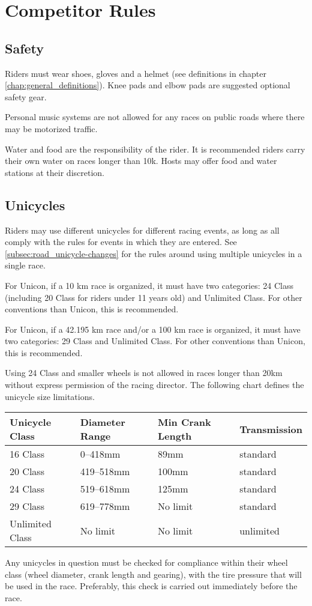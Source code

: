 \chapter{Competitor Rules}

\section{Safety}
Riders must wear shoes, gloves and a helmet (see definitions in chapter \ref{chap:general_definitions}).
Knee pads and elbow pads are suggested optional safety gear.

Personal music systems are not allowed for any races on public roads where there may be motorized traffic.

Water and food are the responsibility of the rider.
It is recommended riders carry their own water on races longer than 10k.
Hosts may offer food and water stations at their discretion.

\section{Unicycles}

Riders may use different unicycles for different racing events, as long as all comply with the rules for events in which they are entered.
See \ref{subsec:road_unicycle-changes} for the rules around using multiple unicycles in a single race.

For Unicon, if a 10 km race is organized, it must have two categories: 24 Class (including 20 Class for riders under 11 years old) and Unlimited Class.
For other conventions than Unicon, this is recommended.

For Unicon, if a 42.195 km race and/or a 100 km race is organized, it must have two categories: 29 Class and Unlimited Class.
For other conventions than Unicon, this is recommended.

Using 24 Class and smaller wheels is not allowed in races longer than 20km without express permission of the racing director.
The following chart defines the unicycle size limitations.

\begin{longtable}{|p{3cm}|p{3.5cm}|p{4cm}|p{3cm}|}
\hline
\textbf{Unicycle Class} & \textbf{Diameter Range} & \textbf{Min Crank Length} & \textbf{Transmission}\\
\hline
16 Class & 0--418mm & 89mm & standard \\
\hline
20 Class & 419--518mm & 100mm & standard \\
\hline
24 Class & 519--618mm & 125mm & standard \\
\hline
29 Class & 619--778mm & No limit & standard \\
\hline
Unlimited Class & No limit & No limit & unlimited \\
\hline
\end{longtable}
Any unicycles in question must be checked for compliance within their wheel class (wheel diameter, crank length and gearing), with the tire pressure that will be used in the race.
Preferably, this check is carried out immediately before the race.

